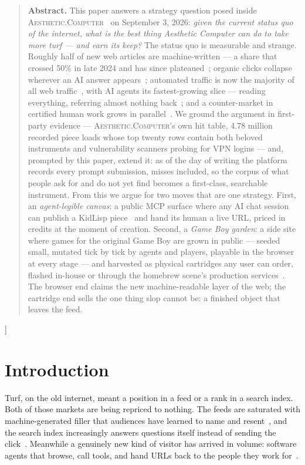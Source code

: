 \documentclass[10pt,letterpaper,twocolumn]{article}
\newcommand{\ac}{\textsc{Aesthetic.Computer}}
\begin{document}
{\begin{quote}
\small\noindent\textbf{Abstract.}
This paper answers a strategy question posed inside \ac{}~\citep{scudder2026ac} on September 3, 2026: \emph{given the current status quo of the internet, what is the best thing Aesthetic Computer can do to take more turf --- and earn its keep?} The status quo is measurable and strange. Roughly half of new web articles are machine-written --- a share that crossed 50\% in late 2024 and has since plateaued~\citep{graphite2026plateau}; organic clicks collapse wherever an AI answer appears~\citep{pew2025aioverviews,sparktoro2024zeroclick}; automated traffic is now the majority of all web traffic~\citep{thales2025badbot}, with AI agents its fastest-growing slice --- reading everything, referring almost nothing back~\citep{cloudflare2026crawlrefer}; and a counter-market in certified human work grows in parallel~\citep{authorsguild2026humanauthored}. We ground the argument in first-party evidence --- \ac{}'s own hit table, 4.78 million recorded piece loads whose top twenty rows contain both beloved instruments and vulnerability scanners probing for VPN logins --- and, prompted by this paper, extend it: as of the day of writing the platform records every prompt submission, misses included, so the corpus of what people ask for and do not yet find becomes a first-class, searchable instrument. From this we argue for two moves that are one strategy. First, an \emph{agent-legible canvas}: a public MCP surface where any AI chat session can publish a KidLisp piece~\citep{scudder2026kidlisp} and hand its human a live URL, priced in credits at the moment of creation. Second, a \emph{Game Boy garden}: a side site where games for the original Game Boy are grown in public --- seeded small, mutated tick by tick by agents and players, playable in the browser at every stage --- and harvested as physical cartridges any user can order, flashed in-house or through the homebrew scene's production services~\citep{insidegadgets2026shop,nintendodiff2026gb}. The browser end claims the new machine-readable layer of the web; the cartridge end sells the one thing slop cannot be: a finished object that leaves the feed.
\end{quote}
\vspace{0.5em}
}]

\section{Introduction}

Turf, on the old internet, meant a position in a feed or a rank in a search index. Both of those markets are being repriced to nothing. The feeds are saturated with machine-generated filler that audiences have learned to name and resent~\citep{meltwater2026slop,forbes2026fans}, and the search index increasingly answers questions itself instead of sending the click~\citep{pew2025aioverviews}. Meanwhile a genuinely new kind of visitor has arrived in volume: software agents that browse, call tools, and hand URLs back to the people they work for~\citep{humansec2026agentic,cloudflare2025yir}.
\end{document}
